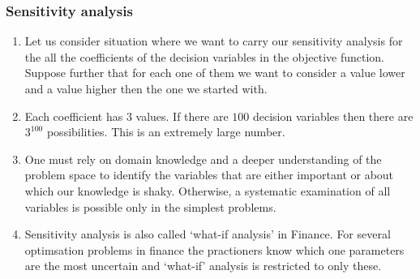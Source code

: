 \documentclass{beamer}
\begin{document}
\begin{frame}
\frametitle{Sensitivity analysis}
\begin{enumerate}
\item Let us consider situation where we want to carry our sensitivity analysis
for the all the coefficients of the decision variables in the objective function.
Suppose further that for each one of them we want to consider a value lower and
a value higher then the one we started with. 
\item Each coefficient has $3$ values. If there are $100$ decision variables then
there are $3^{100}$ possibilities. This is an extremely large number.
\item One must rely on domain knowledge and a deeper understanding of the problem
space to identify the variables that are either important or about which our 
knowledge is shaky. Otherwise, a systematic examination of all variables is 
possible only in the simplest problems.
\item Sensitivity analysis is also called `what-if analysis' in Finance. For 
several optimsation problems in finance the practioners know which one 
parameters are the most uncertain and `what-if' analysis is restricted to only
these.
\end{enumerate}
\end{frame}
\end{document}
